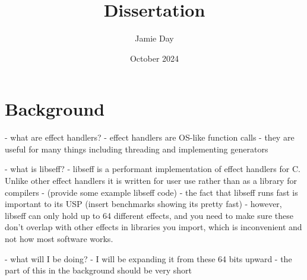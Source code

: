 \documentclass{article}
\title{Dissertation}
\author{Jamie Day}
\date{October 2024}
\begin{document}
\maketitle

\section{Background}

 - what are effect handlers?
    - effect handlers are OS-like function calls
    - they are useful for many things including threading and implementing generators

 - what is libseff?
    - libseff is a performant implementation of effect handlers for C. Unlike other effect handlers it is written for user use rather than as a library for compilers
    - (provide some example libseff code)
    - the fact that libseff runs fast is important to its USP (insert benchmarks showing its pretty fast)
    - however, libseff can only hold up to 64 different effects, and you need to make sure these don't overlap with other effects in libraries you import, which is inconvenient and not how most software works.

- what will I be doing?
    - I will be expanding it from these 64 bits upward
    - the part of this in the background should be very short
\end{document}
